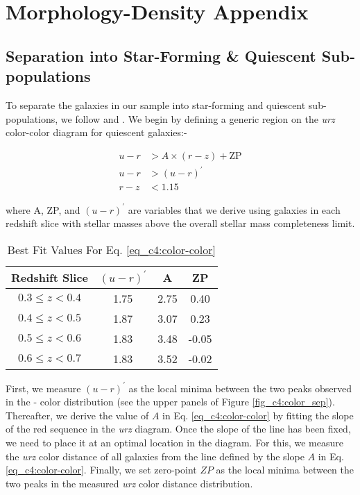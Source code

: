 \chapter*{Morphology-Density Appendix} \label{chap:morph_den_ap}

\section{Separation into Star-Forming \& Quiescent Sub-populations} \label{sec_c4:ap:cc_sel}

To separate the galaxies in our sample into star-forming and quiescent sub-populations, we follow \citet{Kawin16} and \citet{hsc_mass_size}. We begin by defining a generic region on the \textit{urz} color-color diagram for quiescent galaxies:-

\begin{equation}
    \begin{aligned}
        u-r & >A \times(r-z)+\mathrm{ZP} \\
        u-r & >(u-r)^{\prime} \\
        r-z & <1.15
\end{aligned}
\label{eq_c4:color-color}
\end{equation}

\noindent where A, ZP, and $(u-r)^{\prime}$ are variables that we derive using galaxies in each redshift slice with stellar masses above the overall stellar mass completeness limit. 

\begin{table}[htbp]
    \centering
    \caption{Best Fit Values For Eq. \ref{eq_c4:color-color}  \label{tab_c4:color-color}}
    \begin{tabular}{cccc}
    \hline
    \hline
     Redshift Slice & $(u-r)^{\prime}$ & A & ZP \\
     \hline
     \hline
     $0.3 \leq z < 0.4$ & 1.75 & 2.75 & 0.40 \\
     $0.4 \leq z < 0.5$ & 1.87 & 3.07 & 0.23 \\
     $0.5 \leq z < 0.6$ & 1.83 & 3.48 & -0.05 \\
     $0.6 \leq z < 0.7$ & 1.83 & 3.52 & -0.02 \\
     \hline
     \hline
    \end{tabular}
\end{table}

First, we measure $(u-r)^{\prime}$ as the local minima between the two peaks observed in the \uband-\rb{} color distribution (see the upper panels of Figure \ref{fig_c4:color_sep}). Thereafter, we derive the value of $A$ in Eq. \ref{eq_c4:color-color} by fitting the slope of the red sequence in the \textit{urz} diagram. Once the slope of the line has been fixed, we need to place it at an optimal location in the diagram. For this, we measure the \textit{urz} color distance of all galaxies from the line defined by the slope $A$ in Eq. \ref{eq_c4:color-color}. Finally, we set zero-point $ZP$ as the local minima between the two peaks in the measured \textit{urz} color distance distribution. 


